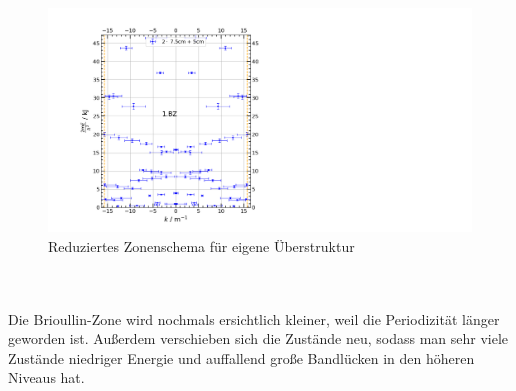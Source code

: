\documentclass[german,  %
parskip=full,  %
]{scrartcl}
\begin{document}
\\\\
\begin{figure}[h!]
\centering
\includegraphics[width=\textwidth]{4633_reduziertes_Zonenschema.png}
\caption{Reduziertes Zonenschema für eigene Überstruktur}
\end{figure}
\\\\
Die Brioullin-Zone wird nochmals ersichtlich kleiner, weil die Periodizität länger geworden ist. Außerdem verschieben sich die Zustände neu, sodass man sehr viele Zustände niedriger Energie und auffallend große Bandlücken in den höheren Niveaus hat. 
\end{document}
